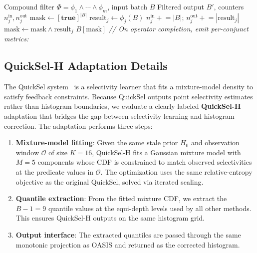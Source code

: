 \begin{algorithm}[H]\small
\caption{Per-Conjunct Operator Instrumentation}
\label{alg:instrument}
\begin{algorithmic}[1]
\Require Compound filter $\Phi = \phi_1 \wedge \cdots \wedge \phi_m$, input batch $B$
\Ensure  Filtered output $B'$, counters $n_j^{\text{in}}, n_j^{\text{out}}$
\State $\text{mask} \leftarrow [\textbf{true}]^{|B|}$
  \State $\text{result}_j \leftarrow \phi_j(B)$
  \State $n_j^{\text{in}} \mathrel{+}= |B|$; \quad $n_j^{\text{out}} \mathrel{+}= |\text{result}_j|$
  \State $\text{mask} \leftarrow \text{mask} \wedge \text{result}_j$
\EndFor
\State \Return $B[\text{mask}]$
\Statex
\Statex \textit{// On operator completion, emit per-conjunct metrics:}
  \State {}
\EndFor
\end{algorithmic}
\end{algorithm}

\subsection{QuickSel-H Adaptation Details}

The QuickSel system~\cite{park2020quicksel} is a selectivity learner that fits a
mixture-model density to satisfy feedback constraints. Because QuickSel outputs
point selectivity estimates rather than histogram boundaries, we evaluate a
clearly labeled \textbf{QuickSel-H} adaptation that bridges the gap between
selectivity learning and histogram correction. The adaptation performs three steps:

\begin{enumerate}
  \item \textbf{Mixture-model fitting}: Given the same stale prior $H_0$ and
        observation window $\mathcal{O}$ of size $K{=}16$, QuickSel-H fits a
        Gaussian mixture model with $M{=}5$ components whose CDF is constrained
        to match observed selectivities at the predicate values in $\mathcal{O}$.
        The optimization uses the same relative-entropy objective as the original
        QuickSel, solved via iterated scaling.
  \item \textbf{Quantile extraction}: From the fitted mixture CDF, we extract
        the $B{-}1{=}9$ quantile values at the equi-depth levels used by all other
        methods. This ensures QuickSel-H outputs on the same histogram grid.
  \item \textbf{Output interface}: The extracted quantiles are passed through
        the same monotonic projection as OASIS and returned as the corrected histogram.
\end{enumerate}

